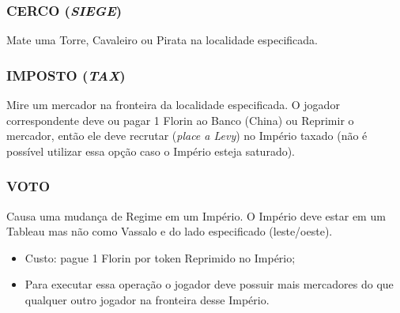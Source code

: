 \documentclass[11pt]{article}
\begin{document}
\subsubsection{CERCO (\emph{SIEGE})}
\label{sec:org8719d39}

Mate uma Torre, Cavaleiro ou Pirata na localidade especificada.

\subsubsection{IMPOSTO (\emph{TAX})}
\label{sec:org2ea9e9e}

Mire um mercador na fronteira da localidade especificada. O jogador correspondente deve ou pagar 1 Florin ao Banco (China) ou Reprimir o mercador, então ele deve recrutar (\emph{place a Levy}) no Império taxado
(não é possível utilizar essa opção caso o Império esteja saturado).

\subsubsection{VOTO}
\label{sec:orge395d2c}

Causa uma mudança de Regime em um Império. O Império deve estar em um Tableau mas não como Vassalo e do lado especificado (leste/oeste).

\begin{itemize}
\item Custo: pague 1 Florin por token Reprimido no Império;

\item Para executar essa operação o jogador deve possuir mais mercadores do que qualquer outro jogador na fronteira desse Império.
\end{itemize}
\end{document}
